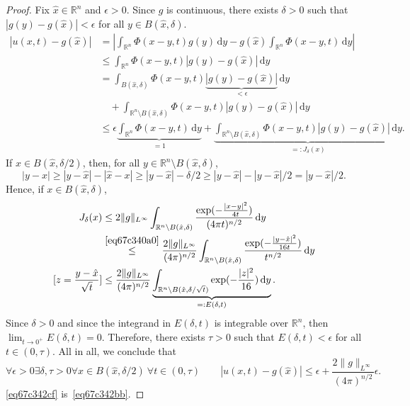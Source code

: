 \documentclass[a4paper,9pt]{amsart}
\newcommand{\R}{\mathbb{R}}	%
\newcommand{\did}{\,\mathrm{d}}	%
\theoremstyle{plain}
\theoremstyle{definition}
\theoremstyle{remark}
\begin{document}
\begin{proof}
	Fix $\hat x\in\R^n$ and $\epsilon>0$.
	Since $g$ is continuous, there exists $\delta>0$ such that $|g(y)-g(\hat x)|<\epsilon$ for all $y\in B(\hat x,\delta)$.
	\begin{align*}
	 	|u(x,t)-g(\hat x)|
		&= \left| \int_{\R^n} \Phi(x-y,t) g(y) \did y - g(\hat x) \int_{\R^n} \Phi(x-y,t)\did y \right| \\
		&\le \int_{\R^n} \Phi(x-y,t) |g(y)-g(\hat x)| \did y \\
		&= \int_{B(\hat x,\delta)} \Phi(x-y,t) \underbrace{|g(y)-g(\hat x)|}_{<\epsilon} \did y \\
		&\quad + \int_{\R^n\setminus B(\hat x,\delta)} \Phi(x-y,t) |g(y)-g(\hat x)| \did y \\
		&\le \epsilon \underbrace{\int_{\R^n} \Phi(x-y,t) \did y}_{=1}
			+ \underbrace{ \int_{\R^n\setminus B(\hat x,\delta)} \Phi(x-y,t) |g(y)-g(\hat x)| \did y }_{=: J_\delta(x)} .
	\end{align*}
	If $x\in B(\hat x,\delta/2)$, then, for all $y\in \R^n\setminus B(\hat x,\delta)$,
	\begin{equation}\label{eq67c340a0}
		|y-x| 
		\ge |y-\hat x|-|\hat x-x|
		\ge |y-\hat x|-\delta/2
		\ge |y-\hat x| - |y-\hat x|/2
		= |y-\hat x|/2 .
	\end{equation}
	Hence, if $x\in B(\hat x,\delta)$, 
	\begin{align*}
	 	J_\delta(x) 
		&\le 2 \|g\|_{L^\infty} \int_{\R^n\setminus B(\hat x,\delta)} \frac{ \exp(-\frac{|x-y|^2}{4t} ) }{ (4\pi t)^{n/2} } \did y \\
		&\overset{\eqref{eq67c340a0}}\le \frac{2 \|g\|_{L^\infty}}{(4\pi)^{n/2}}
			\int_{\R^n\setminus B(\hat x,\delta)} \frac{ \exp(-\frac{|y-\hat x|^2}{16t} ) }{  t^{n/2} } \did y \\
		[z = \frac{y-\hat x}{\sqrt{t}}]
		&\le \frac{2 \|g\|_{L^\infty}}{(4\pi)^{n/2}} 
			\underbrace{\int_{\R^n\setminus B(\hat x,\delta/\sqrt{t})} \exp(-\frac{|z|^2}{16} ) \did y }_{=:E(\delta,t)} .
	\end{align*}
	Since $\delta>0$ and since the integrand in $E(\delta,t)$ is integrable over $\R^n$, then $\lim_{t\to0^+}E(\delta,t) = 0$.
	Therefore, there exists $\tau>0$ such that $E(\delta,t)<\epsilon$ for all $t\in(0,\tau)$.
	All in all, we conclude that
	\begin{equation}\label{eq67c342cf}
		\forall\epsilon>0\exists \delta,\tau>0 \forall x\in B(\hat x,\delta/2)\ \forall t\in(0,\tau)
		\qquad
		|u(x,t) - g(\hat x)| \le \epsilon + \frac{2 \|g\|_{L^\infty}}{(4\pi)^{n/2}} \epsilon .
	\end{equation}
	\eqref{eq67c342cf} is~\eqref{eq67c342bb}.
\end{proof}
\end{document}
